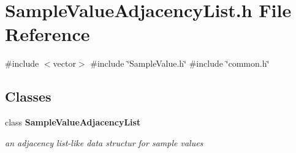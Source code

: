 \section{Sample\+Value\+Adjacency\+List.\+h File Reference}
\label{SampleValueAdjacencyList_8h}
{\ttfamily \#include $<$vector$>$}\newline
{\ttfamily \#include \char`\"{}Sample\+Value.\+h\char`\"{}}\newline
{\ttfamily \#include \char`\"{}common.\+h\char`\"{}}\newline
\subsection*{Classes}
\begin{DoxyCompactItemize}
\item 
class \textbf{ Sample\+Value\+Adjacency\+List}
\begin{DoxyCompactList}\small\item\em an adjacency list-\/like data structur for sample values \end{DoxyCompactList}\end{DoxyCompactItemize}
